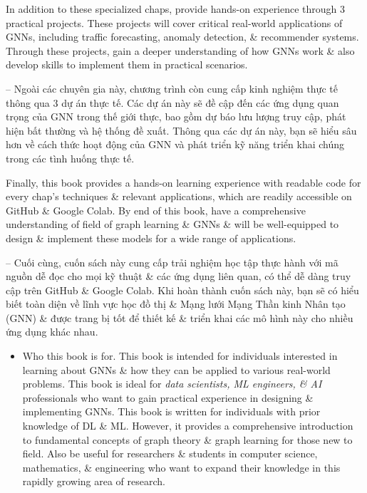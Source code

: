 \documentclass{article}
\begin{document}
\begin{itemize}
    In addition to these specialized chaps, provide hands-on experience through 3 practical projects. These projects will cover critical real-world applications of GNNs, including traffic forecasting, anomaly detection, \& recommender systems. Through these projects, gain a deeper understanding of how GNNs work \& also develop skills to implement them in practical scenarios.

    -- Ngoài các chuyên gia này, chương trình còn cung cấp kinh nghiệm thực tế thông qua 3 dự án thực tế. Các dự án này sẽ đề cập đến các ứng dụng quan trọng của GNN trong thế giới thực, bao gồm dự báo lưu lượng truy cập, phát hiện bất thường và hệ thống đề xuất. Thông qua các dự án này, bạn sẽ hiểu sâu hơn về cách thức hoạt động của GNN và phát triển kỹ năng triển khai chúng trong các tình huống thực tế.

    Finally, this book provides a hands-on learning experience with readable code for every chap's techniques \& relevant applications, which are readily accessible on GitHub \& Google Colab. By end of this book, have a comprehensive understanding of field of graph learning \& GNNs \& will be well-equipped to design \& implement these models for a wide range of applications.

    -- Cuối cùng, cuốn sách này cung cấp trải nghiệm học tập thực hành với mã nguồn dễ đọc cho mọi kỹ thuật \& các ứng dụng liên quan, có thể dễ dàng truy cập trên GitHub \& Google Colab. Khi hoàn thành cuốn sách này, bạn sẽ có hiểu biết toàn diện về lĩnh vực học đồ thị \& Mạng lưới Mạng Thần kinh Nhân tạo (GNN) \& được trang bị tốt để thiết kế \& triển khai các mô hình này cho nhiều ứng dụng khác nhau.
    \begin{itemize}
        \item {\sf Who this book is for.} This book is intended for individuals interested in learning about GNNs \& how they can be applied to various real-world problems. This book is ideal for {\it data scientists, ML engineers, \& AI} professionals who want to gain practical experience in designing \& implementing GNNs. This book is written for individuals with prior knowledge of DL \& ML. However, it provides a comprehensive introduction to fundamental concepts of graph theory \& graph learning for those new to field. Also be useful for researchers \& students in computer science, mathematics, \& engineering who want to expand their knowledge in this rapidly growing area of research.


\end{itemize}
\end{itemize}
\end{document}
